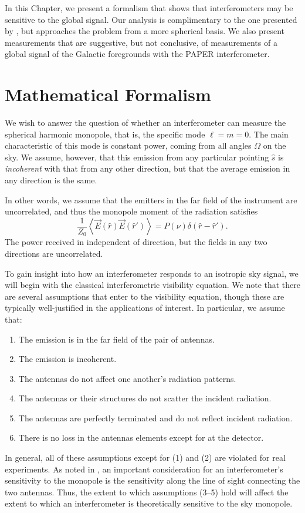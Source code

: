 In this Chapter, we present a formalism that shows that interferometers may be sensitive to the global signal. Our analysis is complimentary to the one presented by \cite{Presley.15}, but approaches the problem from a more spherical basis. We also present measurements that are suggestive, but not conclusive, of measurements of a global signal of the Galactic foregrounds with the PAPER interferometer.

\section{Mathematical Formalism}
\label{sec:global_signal_math}
We wish to answer the question of whether an interferometer can measure the
spherical harmonic monopole, that is, the specific mode $\ell = m =
0$. The main characteristic of this mode is constant power, coming from all angles
$\Omega$ on the sky. We assume, however, that this emission from any particular
pointing $\hat{s}$ is \textit{incoherent} with that from any other direction,
but that the average emission in any direction is the same. 

In other words, we
assume that the emitters in the far field of the instrument are uncorrelated,
and thus the monopole moment of the radiation satisfies
\begin{equation}
\frac{1}{Z_0} \left\langle \vec{E}(\hat{r})\vec{E}(\hat{r}') \right\rangle = P(\nu) \delta(\hat{r} - \hat{r}').
\end{equation}
The power received in independent of direction, but the fields in any two
directions are uncorrelated.

To gain insight into how an interferometer responds to an isotropic sky
signal, we will begin with the classical interferometric visibility equation. We note that
there are several assumptions that enter to the visibility equation, though
these are typically well-justified in the applications of interest. In
particular, we assume that:
\begin{enumerate}
\item The emission is in the far field of the pair of antennas.
\item The emission is incoherent.
\item The antennas do not affect one another's radiation patterns.
\item The antennas or their structures do not scatter the incident radiation.
\item The antennas are perfectly terminated and do not reflect incident radiation.
\item There is no loss in the antennas elements except for at the detector.
\end{enumerate}
In general, all of these assumptions except for (1) and (2) are violated for
real experiments. As noted in \cite{Venumadhav.16}, an important
consideration for an interferometer's sensitivity to the monopole is the
sensitivity along the line of sight connecting the two antennas. Thus, the
extent to which assumptions (3--5) hold will affect the extent to which an
interferometer is theoretically sensitive to the sky monopole.


